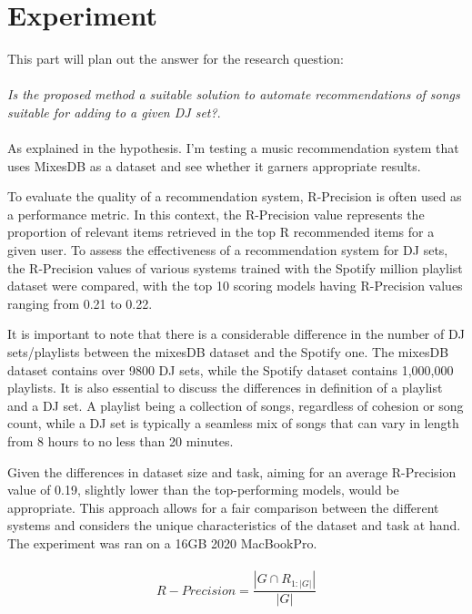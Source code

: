 
\graphicspath{{Chapter5/}}


\chapter{Experiment}


This part will plan out the answer for the research question: 
\\
\\
\textit{Is the proposed method a suitable solution to automate recommendations of songs suitable for adding to a given DJ set?}.
\\
\\
As explained in the hypothesis. I'm testing a music recommendation system that uses MixesDB as a dataset and see whether it garners appropriate results.

To evaluate the quality of a recommendation system, R-Precision is often used as a performance metric. In this context, the R-Precision value represents the proportion of relevant items retrieved in the top R recommended items for a given user. To assess the effectiveness of a recommendation system for DJ sets, the R-Precision values of various systems trained with the Spotify million playlist dataset were compared, with the top 10 scoring models having R-Precision values ranging from 0.21 to 0.22.

It is important to note that there is a considerable difference in the number of DJ sets/playlists between the mixesDB dataset and the Spotify one. The mixesDB dataset contains over 9800 DJ sets, while the Spotify dataset contains 1,000,000 playlists. It is also essential to discuss the differences in definition of a playlist and a DJ set. A playlist being a collection of songs, regardless of cohesion or song count, while a DJ set is typically a seamless mix of songs that can vary in length from 8 hours to no less than 20 minutes.

Given the differences in dataset size and task, aiming for an average R-Precision value of 0.19, slightly lower than the top-performing models, would be appropriate. This approach allows for a fair comparison between the different systems and considers the unique characteristics of the dataset and task at hand. The experiment was ran on a 16GB 2020 MacBookPro.
\\
\\
\begin{equation}
	R-Precision = \frac{|G\cap R_{1:|G|}|}{|G|}
\end{equation}
\\
\\
